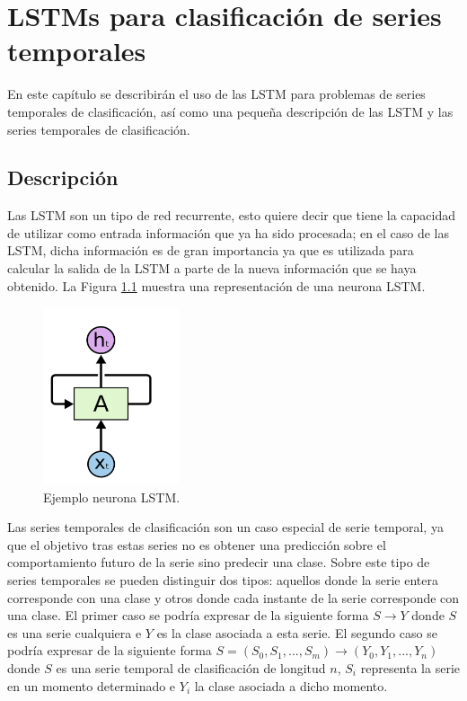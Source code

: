 \chapter{LSTMs para clasificación de series temporales}
En este capítulo se describirán el uso de las LSTM para problemas de series temporales de clasificación, así como una pequeña descripción de las LSTM y las series temporales de clasificación.
\section{Descripción}
Las LSTM son un tipo de red recurrente, esto quiere decir que tiene la capacidad de utilizar como entrada información que ya ha sido procesada; en el caso de las LSTM, dicha información es de gran importancia ya que es utilizada para calcular la salida de la LSTM a parte de la nueva información que se haya obtenido. La Figura \ref{fig:31} muestra una representación de una neurona LSTM.\newline

\begin{figure}[H]
	\centering
	\includegraphics[width=40mm]{imagenes/lstm_basico.png}
	\caption{Ejemplo neurona LSTM.}
	\label{fig:31}
\end{figure}
\verticalspace

Las series temporales de clasificación son un caso especial de serie temporal, ya que el objetivo tras estas series no es obtener una predicción sobre el comportamiento futuro de la serie sino predecir una clase. Sobre este tipo de series temporales se pueden distinguir dos tipos: aquellos donde la serie entera corresponde con una clase y otros donde cada instante de la serie corresponde con una clase. El primer caso se podría expresar de la siguiente forma $ S \rightarrow Y $ donde $S$  es una serie cualquiera e $Y$ es la clase asociada a esta serie. El segundo caso se podría expresar de la siguiente forma $ S = (S_0, S_1,..., S_m) \rightarrow (Y_0,Y_1,..., Y_n) $ donde $S$ es una serie temporal de clasificación de longitud $n$, $S_i$ representa la serie en un momento determinado e $Y_i$ la clase asociada a dicho momento.\newline

